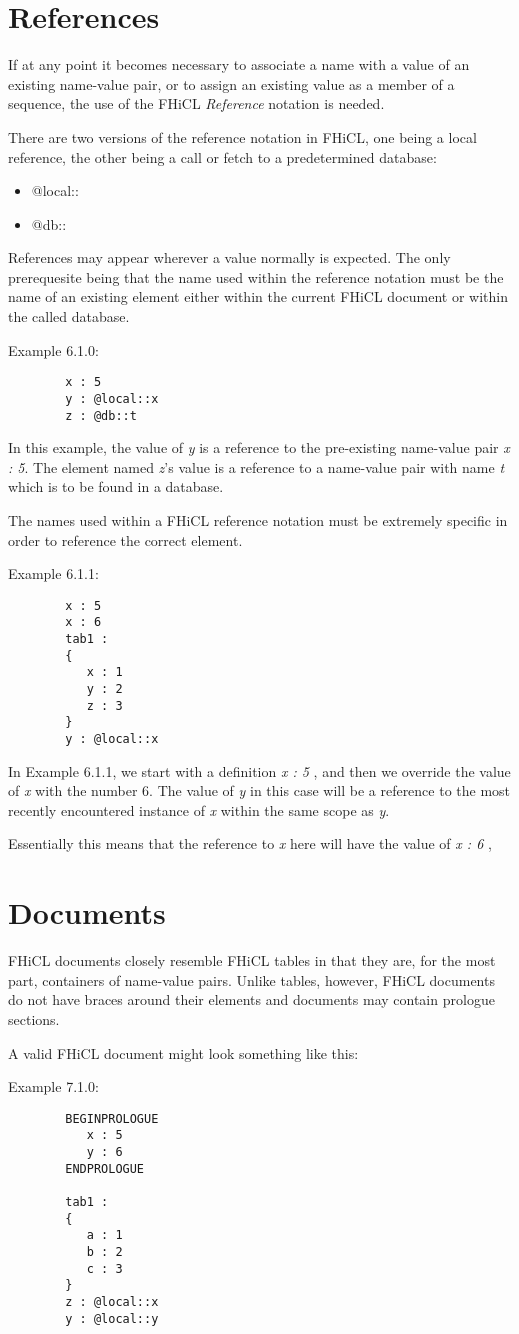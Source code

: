 \documentclass{article}
\begin{document}
\section{References}
	If at any point it becomes necessary to associate a name with a value of an existing name-value pair, or to 
	assign an existing value as a member of a sequence,
	the use of the FHiCL \emph{Reference} notation is needed.
	\par
	There are two versions of the reference notation in FHiCL, one being a local reference, 
	the other being a call or fetch to a predetermined database:
	\begin{itemize}
		\item @local::
		\item @db::
	\end{itemize}
	\par
	References may appear wherever a value normally is expected.
	The only prerequesite being that the name used within the reference notation must be the name of an existing element
	either within the current FHiCL document
	or within the called database.
	\par
	Example 6.1.0:
	\begin{verbatim}
		x : 5
		y : @local::x
		z : @db::t
	\end{verbatim}
	\par
	In this example, the value of \emph{y} is a reference to the pre-existing name-value pair \emph{x : 5}.
	The element named \emph{z}'s value is a reference to a name-value pair with name \emph{t} 
	which is to be found in a database.
	\par
	The names used within a FHiCL reference notation must be extremely specific in order to reference the correct element.
	\par
	Example 6.1.1:
	\begin{verbatim}
		x : 5
		x : 6
		tab1 :
		{
		   x : 1
		   y : 2
		   z : 3
		}
		y : @local::x
	\end{verbatim}
	\par
	In Example 6.1.1, we start with a definition \emph{ x : 5 },
	and then we override the value of \emph{x} with the number 6.
	The value of \emph{y} in this case will be a reference to the
	most recently encountered instance of \emph{x} within the same scope
	as \emph{y}.
	\par
	Essentially this means that the reference to \emph{x} here will have the value
	of \emph{ x : 6 },  
\section{Documents}
	FHiCL documents closely resemble FHiCL tables in that they are, for the most part,
	containers of name-value pairs.
	Unlike tables, however, FHiCL documents do not have braces around their elements
	and documents may contain prologue sections.
	\par
	A valid FHiCL document might look something like this:
	\par
	Example 7.1.0:
	\begin{verbatim}
		BEGINPROLOGUE
		   x : 5
		   y : 6
		ENDPROLOGUE
		
		tab1 :
		{
		   a : 1
		   b : 2
		   c : 3
   		}
		z : @local::x
		y : @local::y
	\end{verbatim}
\end{document}
